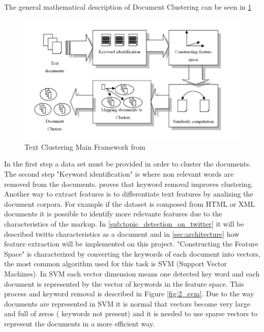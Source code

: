 The general mathematical description of Document Clustering can be seen in \ref{fig:1_Text_Clustering_Main_Framwork}
\begin{figure}
  \begin{center}
    \includegraphics[width=12cm]{images/1_Text_Clustering_Main_Framwork.png}
  \end{center}
  \caption{ Text Clustering Main Framework from \citet{Dozono2012} }
  \label{fig:1_Text_Clustering_Main_Framwork}
\end{figure}
In the first step a data set must be provided in order to cluster the documents. 
The second step "Keyword identification" is where non relevant words are removed from the documents. \citet{Kang2003} proves that keyword removal improves clustering. Another way to extract features is to differentiate text features by analizing the document corpora. For example if the dataset is composed from HTML or XML documents it is possible to identify more relevante features due to the characteristics of the markup. In \ref{sub:topic_detection_on_twitter} it will be described twitts characteristics as a document and in \ref{sec:architecture} how feature extraction will be implemented on this project.
"Constructing the Feature Space" is characterized by converting the keywords of each document into vectors, the most common algorithm used for this task is SVM (Support Vector Machines). In SVM each vector dimension means one detected key word and each document is represented by the vector of keywords in the feature space. This process and keyword removal is described in Figure \ref{fig:2_svm}.
Due to the way documents are represented in SVM it is normal that vectors become very large and full of zeros ( keywords not present) and it is needed to use sparse vectors to represent the documents in a more efficient way.

